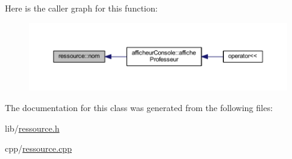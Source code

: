 Here is the caller graph for this function\+:\nopagebreak
\begin{figure}[H]
\begin{center}
\leavevmode
\includegraphics[width=350pt]{classressource_aff712b6d732b3f4091dd29f4349aba85_icgraph}
\end{center}
\end{figure}


The documentation for this class was generated from the following files\+:\begin{DoxyCompactItemize}
\item 
lib/\hyperlink{ressource_8h}{ressource.\+h}\item 
cpp/\hyperlink{ressource_8cpp}{ressource.\+cpp}\end{DoxyCompactItemize}
